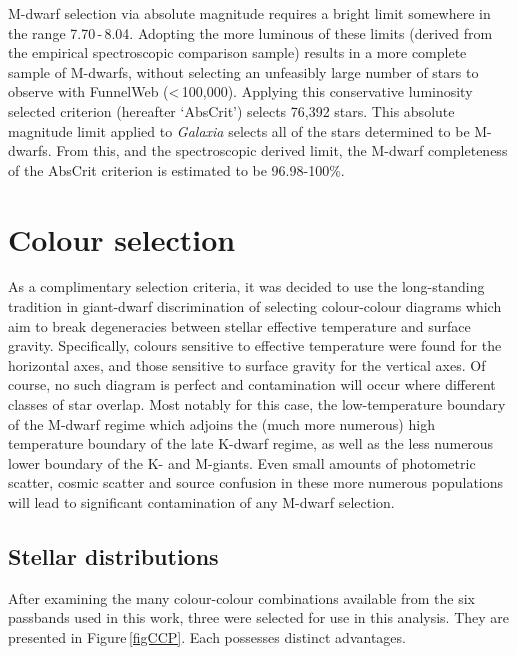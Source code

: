 M-dwarf selection via absolute magnitude requires a bright limit somewhere in the range 7.70\,-\,8.04. Adopting the more luminous of these limits (derived from the empirical spectroscopic comparison sample) results in a more complete sample of M-dwarfs, without selecting an unfeasibly large number of stars to observe with FunnelWeb (\textless\,100,000). Applying this conservative luminosity selected criterion (hereafter `AbsCrit') selects 76,392 stars. This absolute magnitude limit applied to {\em Galaxia} selects all of the stars determined to be M-dwarfs. From this, and the spectroscopic derived limit, the M-dwarf completeness of the AbsCrit criterion is estimated to be 96.98-100\%.
\section{Colour selection}
As a complimentary selection criteria, it was decided to use the long-standing tradition in giant-dwarf discrimination of selecting colour-colour diagrams which aim to break degeneracies between stellar effective temperature and surface gravity. Specifically, colours sensitive to effective temperature were found for the horizontal axes, and those sensitive to surface gravity for the vertical axes. Of course, no such diagram is perfect and contamination will occur where different classes of star overlap. Most notably for this case, the low-temperature boundary of the M-dwarf regime which adjoins the (much more numerous) high temperature boundary of the late K-dwarf regime, as well as the less numerous lower boundary of the K- and M-giants. Even small amounts of photometric scatter, cosmic scatter and source confusion in these more numerous populations will lead to significant contamination of any M-dwarf selection.
\subsection{Stellar distributions}
After examining the many colour-colour combinations available from the six passbands used in this work, three were selected for use in this analysis. They are presented in Figure\,\ref{figCCP}. Each possesses distinct advantages.\\

